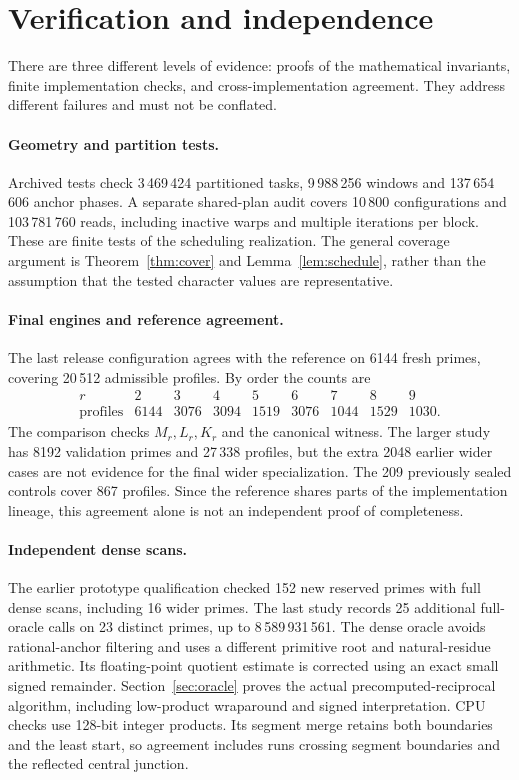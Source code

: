 \documentclass[11pt]{article}
\theoremstyle{definition}\newtheorem{remark}[theorem]{Remark}
\begin{document}
\section{Verification and independence}\label{sec:verification}
There are three different levels of evidence: proofs of the mathematical
invariants, finite implementation checks, and cross-implementation agreement.
They address different failures and must not be conflated.

\paragraph{Geometry and partition tests.}
Archived tests check 3\,469\,424 partitioned tasks, 9\,988\,256 windows
and 137\,654\,606 anchor phases. A separate shared-plan audit covers
10\,800 configurations and 103\,781\,760 reads, including inactive warps
and multiple iterations per block. These are finite tests of the scheduling
realization. The general coverage argument is Theorem~\ref{thm:cover} and
Lemma~\ref{lem:schedule}, rather than the assumption that the tested
character values are representative.

\paragraph{Final engines and reference agreement.}
The last release configuration agrees with the reference on 6144 fresh
primes, covering 20\,512 admissible profiles. By order the counts are
\[
\begin{array}{c|rrrrrrrr}
r&2&3&4&5&6&7&8&9\\\hline
\text{profiles}&6144&3076&3094&1519&3076&1044&1529&1030.
\end{array}
\]
The comparison checks $M_r,L_r,K_r$ and the canonical witness.
The larger study has 8192 validation primes and 27\,338 profiles, but the
extra 2048 earlier wider cases are not evidence for the final wider
specialization. The 209 previously sealed controls cover 867 profiles.
Since the reference shares parts of the implementation lineage, this
agreement alone is not an independent proof of completeness.

\paragraph{Independent dense scans.}
The earlier prototype qualification checked 152 new reserved primes with
full dense scans, including 16 wider primes. The last study records 25
additional full-oracle calls on 23 distinct primes, up to 8\,589\,931\,561.
The dense oracle avoids rational-anchor filtering and uses a different
primitive root and natural-residue arithmetic. Its floating-point quotient
estimate is corrected using an exact small signed remainder. Section~\ref{sec:oracle} proves the actual precomputed-reciprocal
algorithm, including low-product wraparound and signed interpretation. CPU
checks use 128-bit integer products. Its segment
merge retains both boundaries and the least start, so agreement includes
runs crossing segment boundaries and the reflected central junction.
\end{document}
